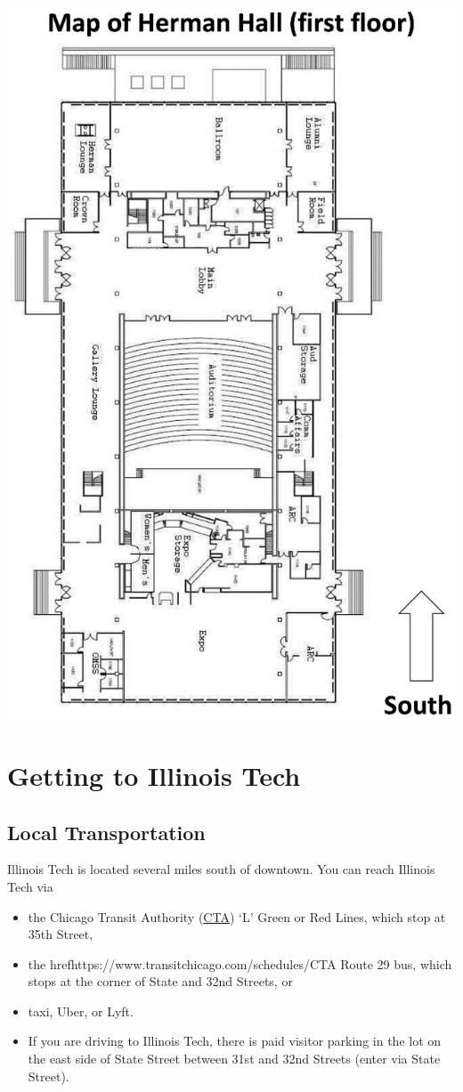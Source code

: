 \begin{center}
	\includegraphics[width =0.95 \textwidth] {Photos/MapHermannHallFirstFloor_cropped.eps}
\end{center}
\clearpage

\section{Getting to Illinois Tech}

\subsection{Local Transportation}
Illinois Tech is located several miles south of downtown.  You  can reach Illinois Tech via 
\begin{itemize}
	\item the Chicago Transit Authority (\href{https://www.transitchicago.com/schedules/}{CTA}) `L' Green or Red Lines, which stop at 35th Street, 
	\item the href{https://www.transitchicago.com/schedules/}{CTA} Route 29 bus, which stops at the corner of State and 32nd Streets, or
	\item taxi, Uber, or Lyft.
	 \item If you are driving to Illinois Tech, there is paid visitor parking in the lot on the east side of State Street between 31st and 32nd Streets (enter via State Street).
\end{itemize}


